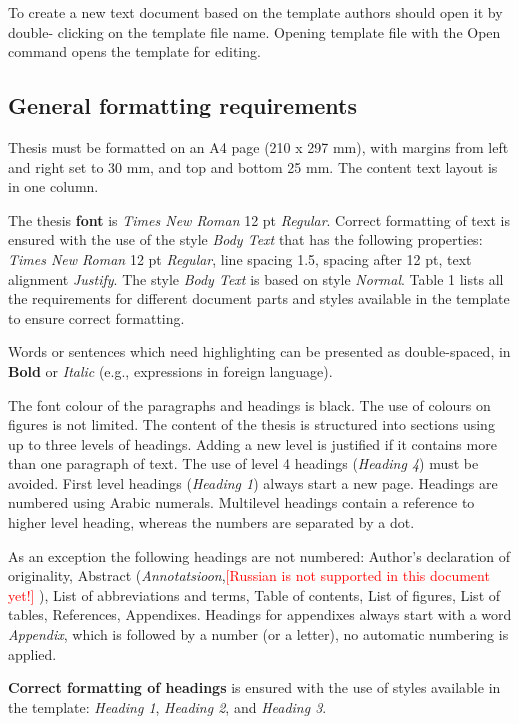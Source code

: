 To create a new text document based on the template authors should open it by double- clicking on the template file name. Opening template file with the Open command opens the template for editing.

\subsection{General formatting requirements}

Thesis must be formatted on an A4 page (210 x 297 mm), with margins from left and right set to 30 mm, and top and bottom 25 mm. The content text layout is in one column.

The thesis \textbf{font} is \textit{Times New Roman} 12 pt \textit{Regular}. Correct formatting of text is ensured with the use of the style \textit{Body Text} that has the following properties: \textit{Times New Roman} 12 pt \textit{Regular}, line spacing 1.5, spacing after 12 pt, text alignment \textit{Justify}. The style \textit{Body Text} is based on style \textit{Normal}. Table 1 lists all the requirements for different document parts and styles available in the template to ensure correct formatting.

Words or sentences which need highlighting can be presented as double-spaced, in \textbf{Bold} or \textit{Italic} (e.g., expressions in foreign language).

The font colour of the paragraphs and headings is black. The use of colours on figures is not limited.
The content of the thesis is structured into sections using up to three levels of headings. Adding a new level is justified if it contains more than one paragraph of text. The use of level 4 headings (\textit{Heading 4}) must be avoided. First level headings (\textit{Heading 1}) always start a new page. Headings are numbered using Arabic numerals. Multilevel headings contain a reference to higher level heading, whereas the numbers are separated by a dot.

As an exception the following headings are not numbered: Author’s declaration of originality, Abstract (\textit{Annotatsioon},\textcolor{red}{[Russian is not supported in this document yet!]}  %
), List of abbreviations and terms, Table of contents, List of figures, List of tables, References, Appendixes. Headings for appendixes always start with a word \textit{Appendix}, which is followed by a number (or a letter), no automatic numbering is applied.

\textbf{Correct formatting of headings} is ensured with the use of styles available in the template: \textit{Heading 1}, \textit{Heading 2}, and \textit{Heading 3}.

